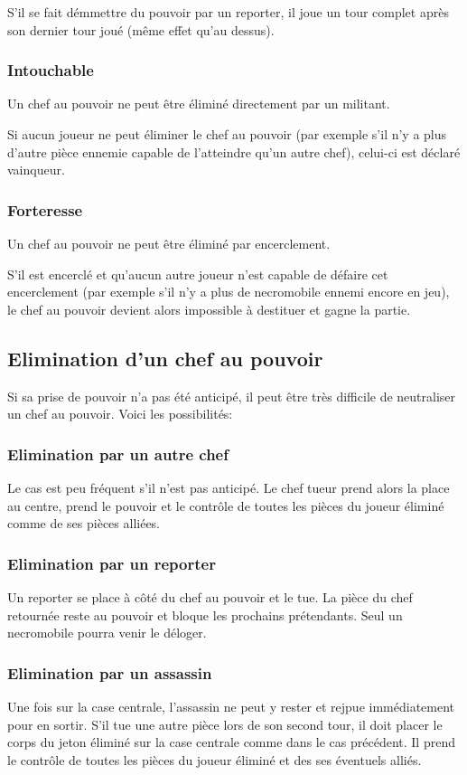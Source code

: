 \documentclass{article}
\begin{document}
S'il se fait démmettre du pouvoir par un reporter, il joue un tour complet après son dernier tour joué (même effet qu'au dessus).

\subsubsection{Intouchable}
Un chef au pouvoir ne peut être éliminé directement par un militant.

Si aucun joueur ne peut éliminer le chef au pouvoir (par exemple s'il n'y a plus d'autre pièce ennemie capable de l'atteindre qu'un autre chef), celui-ci est déclaré vainqueur.

\subsubsection{Forteresse}
Un chef au pouvoir ne peut être éliminé par encerclement. 

S'il est encerclé et qu'aucun autre joueur n'est capable de défaire cet encerclement (par exemple s'il n'y a plus de necromobile ennemi encore en jeu), 
le chef au pouvoir devient alors impossible à destituer et gagne la partie.



\newpage

\subsection{Elimination d'un chef au pouvoir}
Si sa prise de pouvoir n'a pas été anticipé, il peut être très difficile de neutraliser un chef au pouvoir.
Voici les possibilités:

\subsubsection{Elimination par un autre chef}
Le cas est peu fréquent s'il n'est pas anticipé. Le chef tueur prend alors la place au centre, prend le pouvoir et le contrôle de toutes les pièces du joueur éliminé comme de ses pièces alliées.

\subsubsection{Elimination par un reporter}
Un reporter se place à côté du chef au pouvoir et le tue. La pièce du chef retournée reste au pouvoir et bloque les prochains prétendants. Seul un necromobile pourra venir le déloger.

\subsubsection{Elimination par un assassin}
Une fois sur la case centrale, l'assassin ne peut y rester et rejpue immédiatement pour en sortir. S'il tue une autre pièce lors de son second tour, il doit placer le corps du jeton éliminé sur la case
centrale comme dans le cas précédent. Il prend le contrôle de toutes les pièces du joueur éliminé et des ses éventuels alliés.
\end{document}
